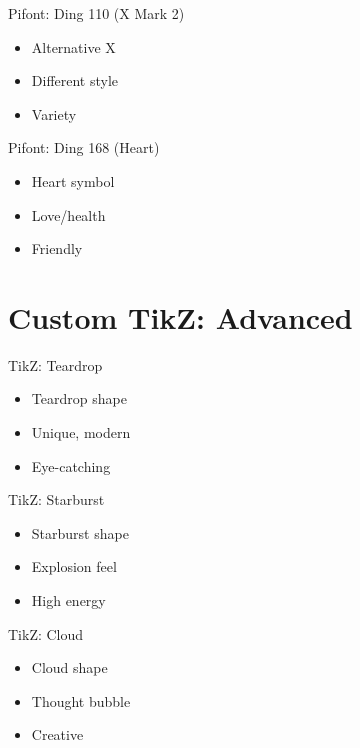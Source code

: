 \documentclass[12pt]{beamer}
\begin{document}
\begin{frame}{Pifont: Ding 110 (X Mark 2)}
\begin{itemize}
  \item Alternative X
  \item Different style
  \item Variety
\end{itemize}
\end{frame}

\begin{frame}{Pifont: Ding 168 (Heart)}
\begin{itemize}
  \item Heart symbol
  \item Love/health
  \item Friendly
\end{itemize}
\end{frame}

\section{Custom TikZ: Advanced}

\begin{frame}{TikZ: Teardrop}
\begin{itemize}
  \item Teardrop shape
  \item Unique, modern
  \item Eye-catching
\end{itemize}
\end{frame}

\begin{frame}{TikZ: Starburst}
\begin{itemize}
  \item Starburst shape
  \item Explosion feel
  \item High energy
\end{itemize}
\end{frame}

\begin{frame}{TikZ: Cloud}
\begin{itemize}
  \item Cloud shape
  \item Thought bubble
  \item Creative
\end{itemize}
\end{frame}
\end{document}
